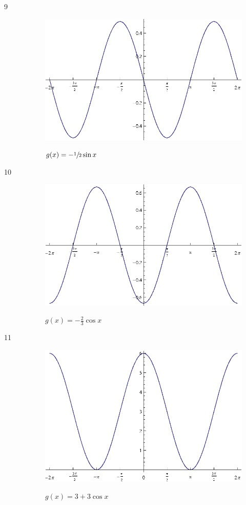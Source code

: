 \documentclass{exam}
\begin{document}
\begin{description}
    \item[9]
      \begin{figure}[H]
        \centering
        \includegraphics[scale=0.9]{exercise09.eps}

        $g(x) = - \sfrac{1}{2} \sin x$
      \end{figure}

    \item[10]
      \begin{figure}[H]
        \centering
        \includegraphics[scale=0.9]{exercise10.eps}

        $g(x) = - \frac{2}{3} \cos x$
      \end{figure}

    \item[11]
      \begin{figure}[H]
        \centering
        \includegraphics[scale=0.9]{exercise11.eps}

        $g(x) = 3 + 3 \cos x$
      \end{figure}
  \end{description}
\end{document}
